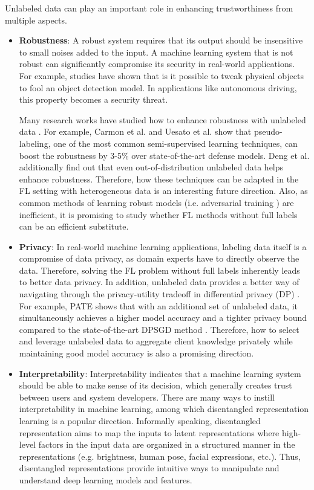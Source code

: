 \documentclass[11pt]{article}
\begin{document}
Unlabeled data can play an important role in enhancing trustworthiness from multiple aspects. 
\begin{itemize}
    \item \textbf{Robustness}: A robust system requires that its output should be insensitive to small noises added to the input. A machine learning system that is not robust can significantly compromise its security in real-world applications. For example, studies \cite{kurakin2018adversarial} have shown that is it possible to tweak physical objects to fool an object detection model. In applications like autonomous driving, this property becomes a security threat. 

    Many research works have studied how to enhance robustness with unlabeled data \cite{deng2021improving,carmon2019unlabeled}. For example, Carmon et al. and Uesato et al. \cite{carmon2019unlabeled,alayrac2019labels} show that pseudo-labeling, one of the most common semi-supervised learning techniques, can boost the robustness by 3-5\% over state-of-the-art defense models. Deng et al. \cite{deng2021improving} additionally find out that even out-of-distribution unlabeled data helps enhance robustness. Therefore, how these techniques can be adapted in the FL setting with heterogeneous data is an interesting future direction. Also, as common methods of learning robust models (i.e. adversarial training \cite{madry2018towards}) are inefficient, it is promising to study whether FL methods without full labels can be an efficient substitute. 

    \item \textbf{Privacy}: In real-world machine learning applications, labeling data itself is a compromise of data privacy, as domain experts have to directly observe the data. Therefore, solving the FL problem without full labels inherently leads to better data privacy. In addition, unlabeled data provides a better way of navigating through the privacy-utility tradeoff in differential privacy (DP) \cite{dwork2014algorithmic}. For example, PATE \cite{papernot2017semi} shows that with an additional set of unlabeled data, it simultaneously achieves a higher model accuracy and a tighter privacy bound compared to the state-of-the-art DPSGD method \cite{abadi2016deep}. Therefore, how to select and leverage unlabeled data to aggregate client knowledge privately while maintaining good model accuracy is also a promising direction. 

    \item \textbf{Interpretability}: Interpretability indicates that a machine learning system should be able to make sense of its decision, which generally creates trust between users and system developers. There are many ways to instill interpretability in machine learning, among which disentangled representation learning \cite{lee2018diverse} is a popular direction. Informally speaking, disentangled representation aims to map the inputs to latent representations where high-level factors in the input data are organized in a structured manner in the representations (e.g. brightness, human pose, facial expressions, etc.). Thus, disentangled representations provide intuitive ways to manipulate and understand deep learning models and features. 


\end{itemize}
\end{document}
